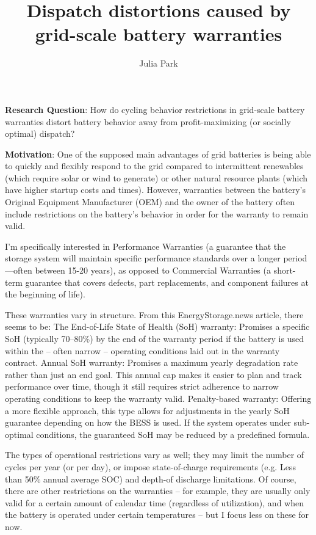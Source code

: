 \documentclass{article}
\title{Dispatch distortions caused by grid-scale battery warranties}
\author{Julia Park}
\begin{document}
\maketitle

\textbf{Research Question}: 
How do cycling behavior restrictions in grid-scale battery warranties distort battery behavior away from profit-maximizing (or socially optimal) dispatch?

\textbf{Motivation}:
One of the supposed main advantages of grid batteries is being able to quickly and flexibly respond to the grid compared to intermittent renewables (which require solar or wind to generate) or other natural resource plants (which have higher startup costs and times). However, warranties between the battery’s Original Equipment Manufacturer (OEM) and the owner of the battery often include restrictions on the battery’s behavior in order for the warranty to remain valid. 

I’m specifically interested in Performance Warranties (a guarantee that the storage system will maintain specific performance standards over a longer period—often between 15-20 years), as opposed to Commercial Warranties (a short-term guarantee that covers defects, part replacements, and component failures at the beginning of life). 

These warranties vary in structure. From this EnergyStorage.news article, there seems to be: 
The End-of-Life State of Health (SoH) warranty: Promises a specific SoH (typically 70–80\%) by the end of the warranty period if the battery is used within the – often narrow – operating conditions laid out in the warranty contract.
Annual SoH warranty: Promises a maximum yearly degradation rate rather than just an end goal. This annual cap makes it easier to plan and track performance over time, though it still requires strict adherence to narrow operating conditions to keep the warranty valid.
Penalty-based warranty: Offering a more flexible approach, this type allows for adjustments in the yearly SoH guarantee depending on how the BESS is used. If the system operates under sub-optimal conditions, the guaranteed SoH may be reduced by a predefined formula.

The types of operational restrictions vary as well; they may limit the number of cycles per year (or per day), or impose state-of-charge requirements (e.g. Less than 50\% annual average SOC) and depth-of discharge limitations. Of course, there are other restrictions on the warranties – for example, they are usually only valid for a certain amount of calendar time (regardless of utilization), and when the battery is operated under certain temperatures – but I focus less on these for now. 
\end{document}

